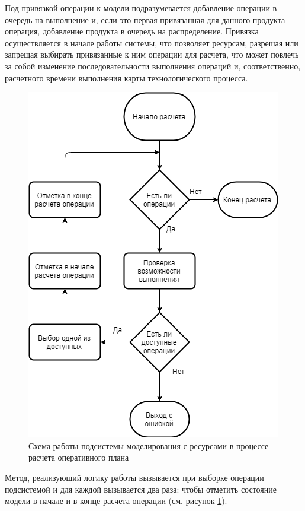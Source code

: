 \indent Под привязкой операции к модели подразумевается добавление операции в очередь на выполнение и, если это первая привязанная для данного продукта операция, добавление продукта в очередь на распределение. Привязка осуществляется в начале работы системы, что позволяет ресурсам, разрешая или запрещая выбирать привязанные к ним операции для расчета, что может повлечь за собой изменение последовательности выполнения операций и, соответственно, расчетного времени выполнения карты технологического процесса.

\begin{figure}[h]
	\centering
	\includegraphics[scale=0.6]{pics/assemblyResSchema.png}
	\caption{Схема работы подсистемы моделирования с ресурсами в процессе расчета оперативного плана}
	\label{fig:assemblyResSchema}
\end{figure}

\indent Метод, реализующий логику работы вызывается при выборке операции подсистемой и для каждой вызывается два раза: чтобы отметить состояние модели в начале и в конце расчета операции (см. рисунок \ref{fig:assemblyResSchema}).

